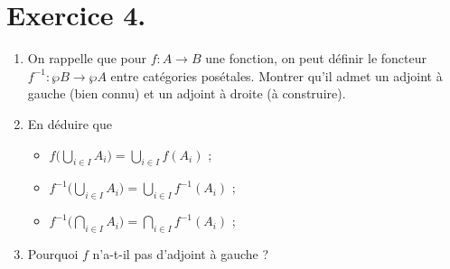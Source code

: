 \documentclass{../../td}
\begin{document}
  \chapter{Exercice 4.}
  \begin{slshape}
    \color{deepblue}
    \begin{enumerate}
      \item On rappelle que pour $f : A \to B$ une fonction, on peut définir le foncteur $f^{-1} : \wp B \to \wp A$ entre catégories posétales. Montrer qu'il admet un adjoint à gauche (bien connu) et un adjoint à droite (à construire).
      \item En déduire que
        \begin{itemize}
          \item $f\big(\bigcup_{i \in I} A_i\big) = \bigcup_{i \in  I} f(A_i)$ ;
          \item $f^{-1}\big(\bigcup_{i \in I} A_i\big) = \bigcup_{i \in  I} f^{-1}(A_i)$ ;
          \item $f^{-1}\big(\bigcap_{i \in I} A_i\big) = \bigcap_{i \in  I} f^{-1}(A_i)$ ;
        \end{itemize}
      \item Pourquoi $f$ n'a-t-il pas d'adjoint à gauche ?
    \end{enumerate}
  \end{slshape}
\end{document}
